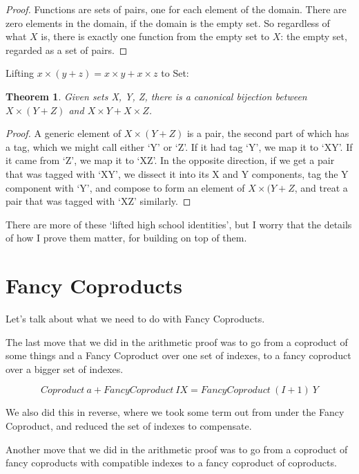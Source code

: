 \documentclass{proc-l}
\newtheorem{theorem}{Theorem}[section]
\theoremstyle{definition}
\theoremstyle{remark}
\numberwithin{equation}{section}
\begin{document}
\begin{proof}
Functions are sets of pairs, one for each element of the domain. There are zero elements in the domain, if the domain is the empty set. So regardless of what \(X\) is, there is exactly one function from the empty set to \(X\): the empty set, regarded as a set of pairs.
\end{proof}

Lifting \(x \times (y + z) = x \times y + x \times z\) to Set:

\begin{theorem}
Given sets X, Y, Z, there is a canonical bijection between \(X \times (Y + Z)\) and \(X \times Y + X \times Z\).
\end{theorem}

\begin{proof}
A generic element of \(X \times (Y + Z)\) is a pair, the second part of which has a tag, which we might call either `Y' or `Z'. If it had tag `Y', we map it to `XY'. If it came from `Z', we map it to `XZ'. In the opposite direction, if we get a pair that was tagged with `XY', we dissect it into its X and Y components, tag the Y component with `Y', and compose to form an element of \(X \times (Y + Z\), and treat a pair that was tagged with `XZ' similarly. 
\end{proof}

There are more of these `lifted high school identities', but I worry that the details of how I prove them matter, for building on top of them.

\section{Fancy Coproducts}

Let's talk about what we need to do with Fancy Coproducts.

The last move that we did in the arithmetic proof was
to go from a coproduct of some things and a Fancy Coproduct over one set of indexes, to a fancy coproduct over a bigger set of indexes.

\[
Coproduct~a + FancyCoproduct~I X = FancyCoproduct~(I+1)~Y
\]

We also did this in reverse, where we took some term out from under the Fancy Coproduct, and reduced the set of indexes to compensate.

Another move that we did in the arithmetic proof was
to go from a coproduct of fancy coproducts with compatible indexes to a fancy coproduct of coproducts.
\end{document}
